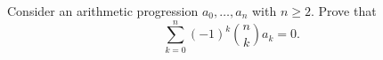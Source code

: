 Consider an arithmetic progression $a_0,\ldots,a_n$ with $n\ge2$. Prove that $$\sum_{k=0}^n(-1)^k\binom{n}{k}a_k=0.$$